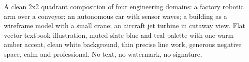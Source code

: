 A clean 2x2 quadrant composition of four engineering domains: a factory robotic arm over a conveyor; an autonomous car with sensor waves; a building as a wireframe model with a small crane; an aircraft jet turbine in cutaway view. Flat vector textbook illustration, muted slate blue and teal palette with one warm amber accent, clean white background, thin precise line work, generous negative space, calm and professional. No text, no watermark, no signature.
